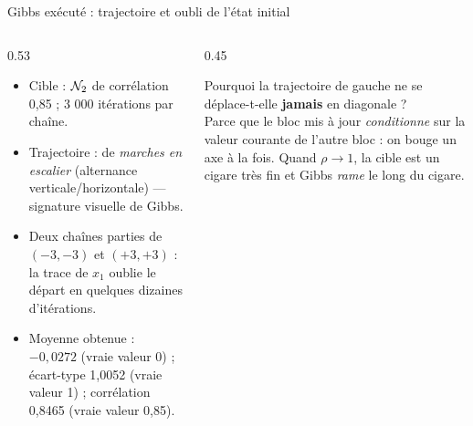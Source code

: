 \begin{frame}{Gibbs exécuté : trajectoire et oubli de l'état initial}

\vspace{-2.5mm}
\begin{columns}[t]
\begin{column}{0.53\textwidth}
\begin{solbox}
\begin{itemize}
  \item Cible : $\mathcal{N}_2$ de corrélation 0,85 ; 3 000 itérations par chaîne.
  \item Trajectoire : de \emph{marches en escalier} (alternance
        verticale/horizontale) --- signature visuelle de Gibbs.
  \item Deux chaînes parties de $(-3,-3)$ et $(+3,+3)$ : la trace de $x_1$
        oublie le départ en quelques dizaines d'itérations.
  \item Moyenne obtenue : $-0{,}0272$ (vraie valeur 0) ; écart-type 1,0052
        (vraie valeur 1) ; corrélation 0,8465 (vraie valeur 0,85).
\end{itemize}
\end{solbox}
\end{column}
\begin{column}{0.45\textwidth}
\begin{qbox}
Pourquoi la trajectoire de gauche ne se déplace-t-elle \textbf{jamais} en
diagonale ?
\vspace{1mm}
\\ \footnotesize Parce que le bloc mis à jour \emph{conditionne} sur la valeur
courante de l'autre bloc : on bouge un axe à la fois. Quand $\rho \to 1$, la cible
est un cigare très fin et Gibbs \emph{rame} le long du cigare.
\end{qbox}
\end{column}
\end{columns}
\end{frame}

